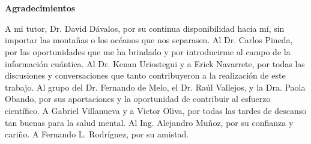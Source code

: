 \section*{}
\vspace{6cm}
\textbf{\Large Agradecimientos}
\newline

A mi tutor, Dr. David Dávalos, por su continua disponibilidad hacia mí, sin importar las montañas o los océanos que nos separasen. 
%
Al Dr. Carlos Pineda, por las oportunidades que me ha brindado y por introducirme al campo de la información cuántica.
%
Al Dr. Kenan Uriostegui y a Erick Navarrete, por todas las discusiones y conversaciones que tanto contribuyeron a la realización de este trabajo. 
%
Al grupo del Dr. Fernando de Melo, el Dr. Raúl Vallejos, y la Dra. Paola Obando, por sus aportaciones y la oportunidad de contribuir al esfuerzo científico.
%
A Gabriel Villanueva y a Victor Oliva, por todas las tardes de descanso tan buenas para la salud mental.
%
Al Ing. Alejandro Muñoz, por su confianza y cariño. 
%
A Fernando L. Rodríguez, por su amistad.
\vfill{}